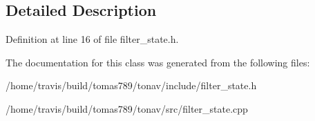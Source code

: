 \subsection{Detailed Description}


Definition at line 16 of file filter\-\_\-state.\-h.



The documentation for this class was generated from the following files\-:\begin{DoxyCompactItemize}
\item 
/home/travis/build/tomas789/tonav/include/filter\-\_\-state.\-h\item 
/home/travis/build/tomas789/tonav/src/filter\-\_\-state.\-cpp\end{DoxyCompactItemize}
